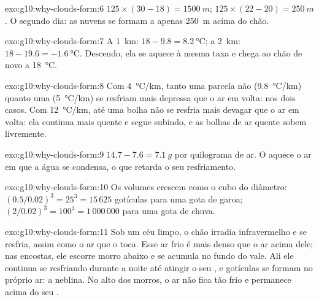 \begin{solution}{exo:g10:why-clouds-form:6}
$125 \times (30 - 18) = \qty{1500}{m}$; $125 \times (22 - 20) =
\qty{250}{m}$. O segundo dia: as nuvens se formam a apenas \qty{250}{m}
acima do chão.
\end{solution}

\begin{solution}{exo:g10:why-clouds-form:7}
A \qty{1}{km}: $18 - 9.8 = \qty{8.2}{\degreeCelsius}$; a \qty{2}{km}:
$18 - 19.6 = \qty{-1.6}{\degreeCelsius}$. Descendo, ela se aquece à mesma
taxa e chega ao chão de novo a \qty{18}{\degreeCelsius}.
\end{solution}

\begin{solution}{exo:g10:why-clouds-form:8}
Com \qty{4}{\degreeCelsius/km}, tanto uma parcela não 
(\qty{9.8}{\degreeCelsius/km}) quanto uma 
(\qty{5}{\degreeCelsius/km}) se resfriam mais depressa que o ar em volta:
 nos dois casos. Com \qty{12}{\degreeCelsius/km}, até uma bolha não
 se resfria mais devagar que o ar em volta: ela continua mais quente
e segue subindo, e as bolhas de ar quente sobem livremente.
\end{solution}

\begin{solution}{exo:g10:why-clouds-form:9}
$14.7 - 7.6 = \qty{7.1}{g}$ por quilograma de ar. O  aquece o
ar em que a água se condensa, o que retarda o seu resfriamento.
\end{solution}

\begin{solution}{exo:g10:why-clouds-form:10}
Os volumes crescem como o cubo do diâmetro: $(0.5/0.02)^3 = 25^3 = 15\,625$
gotículas para uma gota de garoa; $(2/0.02)^3 = 100^3 = 1\,000\,000$ para
uma gota de chuva.
\end{solution}

\begin{solution}{exo:g10:why-clouds-form:11}
Sob um céu limpo, o chão irradia infravermelho e se resfria, assim como o ar
que o toca. Esse ar frio é mais denso que o ar acima dele; nas encostas, ele
escorre morro abaixo e se acumula no fundo do vale. Ali ele continua se
resfriando durante a noite até atingir o seu , e gotículas
se formam no próprio ar: a neblina. No alto dos morros, o ar não fica tão
frio e permanece acima do seu .
\end{solution}

